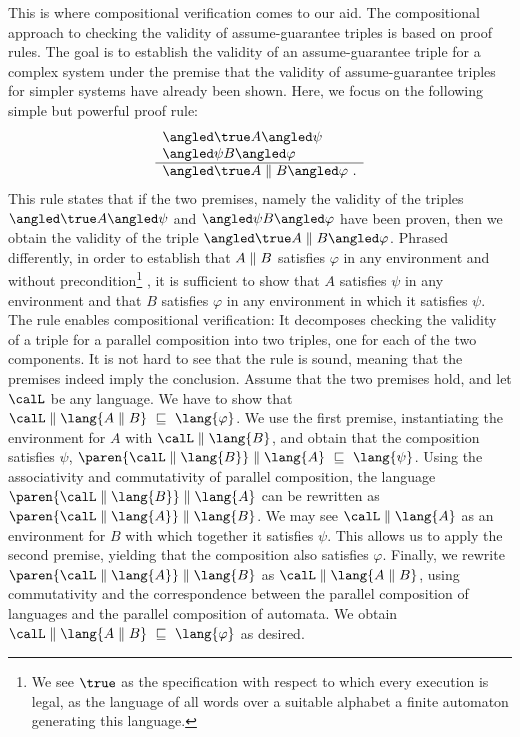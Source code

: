 \documentclass[../../diss.tex]{subfiles}
\begin{document}
This is where compositional verification comes to our aid.
The compositional approach to checking the validity of assume-guarantee triples is based on proof rules.
The goal is to establish the validity of an assume-guarantee triple for a complex system under the premise that the validity of assume-guarantee triples for simpler systems have already been shown.
Here, we focus on the following simple but powerful proof rule:
\[
    \begin{array}{l}
        \agtriple{\true}{A}{\psi}
        \\
        \agtriple{\psi}{B}{\varphi}
        \\
        \hline
        \agtriple{\true}{A \parcomp B}{\varphi}
        \ .
    \end{array}
\]
This rule states that if the two premises, namely the validity of the triples $\agtriple{\true}{A}{\psi}$ and $\agtriple{\psi}{B}{\varphi}$ have been proven, then we obtain the validity of the triple $\agtriple{\true}{A \parcomp B}{\varphi}$.
Phrased differently, in order to establish that $A \mathrel{\|} B$ satisfies $\varphi$ in any environment and without precondition\footnote{%
        We see $\true$ as the specification with respect to which every execution is legal, \ie as the language of all words over a suitable alphabet \resp a finite automaton generating this language.
    }%
    , it is sufficient to show that $A$ satisfies $\psi$ in any environment and that $B$ satisfies $\varphi$ in any environment in which it satisfies $\psi$.
The rule enables compositional verification: It decomposes checking the validity of a triple for a parallel composition into two triples, one for each of the two components.
It is not hard to see that the rule is sound, meaning that the premises indeed imply the conclusion.
Assume that the two premises hold, and let $\calL$ be any language. We have to show that $\calL \parcomp \lang{A \parcomp B} \ \sqsubseteq \ \lang{\varphi}$.
We use the first premise, instantiating the environment for $A$ with $\calL \parcomp \lang{B}$, and obtain that the composition satisfies $\psi$, $\paren { \calL \parcomp \lang{B}} \parcomp  \lang{A}  \ \sqsubseteq \ \lang{\psi}$.
Using the associativity and commutativity of parallel composition, the language $\paren { \calL \parcomp \lang{B}} \parcomp  \lang{A}$ can be rewritten as $\paren { \calL \parcomp \lang{A}} \parcomp  \lang{B}$.
We may see $\calL \parcomp \lang{A}$ as an environment for $B$ with which together it satisfies $\psi$.
This allows us to apply the second premise, yielding that the composition also satisfies $\varphi$.
Finally, we rewrite $\paren { \calL \parcomp \lang{A}} \parcomp  \lang{B}$ as $\calL \parcomp \lang{A \parcomp B}$, using commutativity and the correspondence between the parallel composition of languages and the parallel composition of automata.
We obtain $\calL \parcomp \lang{A \parcomp B} \ \sqsubseteq  \ \lang{\varphi}$ as desired.
\end{document}
